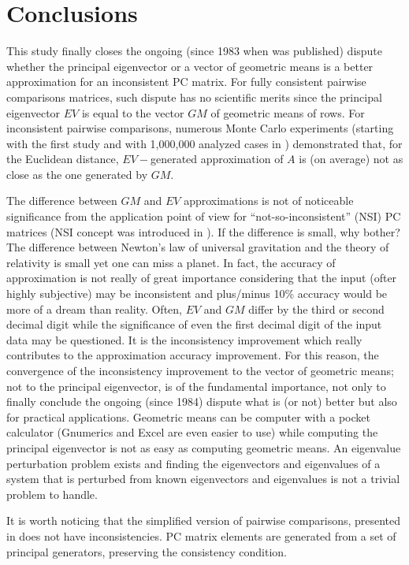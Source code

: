 \documentclass [12pt]{article}
\theoremstyle{definition}
\begin{document}
\section{Conclusions}

This study finally closes the ongoing (since 1983 when \cite{Jensen84} was published) dispute whether the principal eigenvector or a vector of geometric means is a better approximation for an inconsistent PC matrix.
For fully consistent pairwise comparisons matrices, such dispute has no scientific merits since the principal eigenvector $EV$ is equal to the vector $GM$ of geometric means of rows. For inconsistent pairwise comparisons, numerous Monte Carlo experiments (starting with the first study \cite{Jensen84} and with 1,000,000 analyzed cases in \cite{HK1996b}) demonstrated that, for the Euclidean distance, $EV-$generated approximation of $A$ is (on average) not as close as the one generated by $GM$.

The difference between $GM$ and $EV$ approximations is not of noticeable significance from the application point of view for ``not-so-inconsistent'' (NSI) PC matrices (NSI concept was introduced in \cite{HK1996}). If the difference is small, why bother? The difference between Newton's law of universal gravitation and the theory of relativity is small yet one can miss a planet. 
In fact, the accuracy of approximation is not really of great importance considering that the input (ofter highly subjective) may be inconsistent and plus/minus 10\% accuracy would be more of a dream than reality. Often, $EV$ and $GM$  differ by the third or second decimal digit while the significance of even the first decimal digit of the input data may be questioned. 
It is the inconsistency improvement which really contributes to the approximation accuracy improvement. For this reason, the convergence of the inconsistency improvement to the vector of geometric means; not to the principal eigenvector, is of the fundamental importance, not only to finally conclude the ongoing (since 1984) dispute what is (or not) better but also for practical applications. Geometric means can be computer with a pocket calculator (Gnumerics and Excel are even easier to use) while computing the principal eigenvector is not as easy as computing geometric means. An eigenvalue perturbation problem exists and finding the eigenvectors and eigenvalues of a system that is perturbed from known eigenvectors and eigenvalues is not a trivial problem to handle.

It is worth noticing that the simplified version of pairwise comparisons, presented in \cite{KS2015a} does not have inconsistencies. PC matrix elements are generated from a set of principal generators, preserving the consistency condition.
\end{document}

